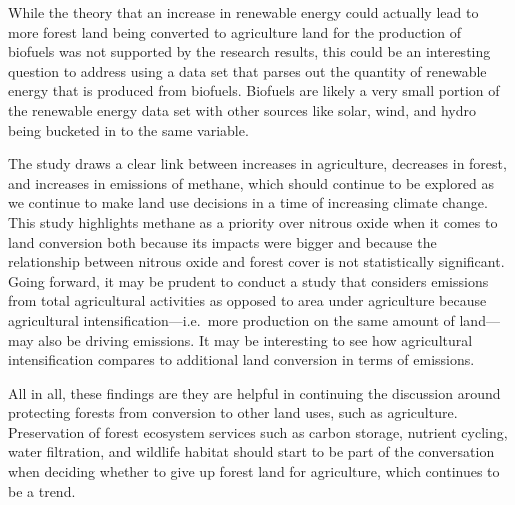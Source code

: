 \documentclass[12pt,]{article}
\begin{document}
While the theory that an increase in renewable energy could actually
lead to more forest land being converted to agriculture land for the
production of biofuels was not supported by the research results, this
could be an interesting question to address using a data set that parses
out the quantity of renewable energy that is produced from biofuels.
Biofuels are likely a very small portion of the renewable energy data
set with other sources like solar, wind, and hydro being bucketed in to
the same variable.

The study draws a clear link between increases in agriculture, decreases
in forest, and increases in emissions of methane, which should continue
to be explored as we continue to make land use decisions in a time of
increasing climate change. This study highlights methane as a priority
over nitrous oxide when it comes to land conversion both because its
impacts were bigger and because the relationship between nitrous oxide
and forest cover is not statistically significant. Going forward, it may
be prudent to conduct a study that considers emissions from total
agricultural activities as opposed to area under agriculture because
agricultural intensification---i.e.~more production on the same amount
of land---may also be driving emissions. It may be interesting to see
how agricultural intensification compares to additional land conversion
in terms of emissions.

All in all, these findings are they are helpful in continuing the
discussion around protecting forests from conversion to other land uses,
such as agriculture. Preservation of forest ecosystem services such as
carbon storage, nutrient cycling, water filtration, and wildlife habitat
should start to be part of the conversation when deciding whether to
give up forest land for agriculture, which continues to be a trend.
\end{document}
